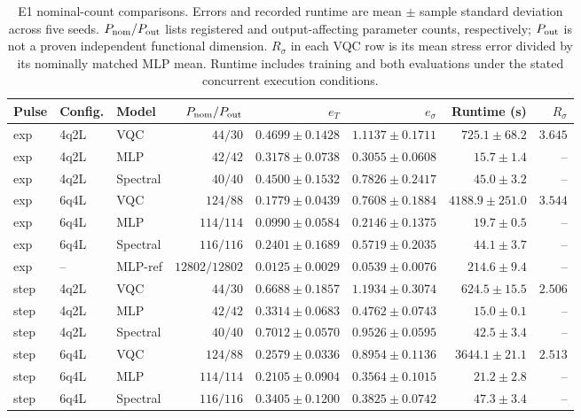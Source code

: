 \documentclass[11pt]{article}
\begin{document}
\begin{table}[htbp]
\centering
\caption{E1 nominal-count comparisons. Errors and recorded runtime are mean $\pm$ sample standard deviation across five seeds. $P_{\rm nom}/P_{\rm out}$ lists registered and output-affecting parameter counts, respectively; $P_{\rm out}$ is not a proven independent functional dimension. $R_\sigma$ in each VQC row is its mean stress error divided by its nominally matched MLP mean. Runtime includes training and both evaluations under the stated concurrent execution conditions.}
\label{tab:e1}
\scriptsize
\setlength{\tabcolsep}{3pt}
\begin{tabular}{lllrrrrr}
\toprule
Pulse & Config. & Model & $P_{\rm nom}/P_{\rm out}$ & $e_T$ & $e_\sigma$ & Runtime (s) & $R_\sigma$ \\
\midrule
exp & 4q2L & VQC & $44/30$ & $0.4699\pm0.1428$ & $1.1137\pm0.1711$ & $725.1\pm68.2$ & $3.645$ \\
exp & 4q2L & MLP & $42/42$ & $0.3178\pm0.0738$ & $0.3055\pm0.0608$ & $15.7\pm1.4$ & -- \\
exp & 4q2L & Spectral & $40/40$ & $0.4500\pm0.1532$ & $0.7826\pm0.2417$ & $45.0\pm3.2$ & -- \\
exp & 6q4L & VQC & $124/88$ & $0.1779\pm0.0439$ & $0.7608\pm0.1884$ & $4188.9\pm251.0$ & $3.544$ \\
exp & 6q4L & MLP & $114/114$ & $0.0990\pm0.0584$ & $0.2146\pm0.1375$ & $19.7\pm0.5$ & -- \\
exp & 6q4L & Spectral & $116/116$ & $0.2401\pm0.1689$ & $0.5719\pm0.2035$ & $44.1\pm3.7$ & -- \\
exp & -- & MLP-ref & $12802/12802$ & $0.0125\pm0.0029$ & $0.0539\pm0.0076$ & $214.6\pm9.4$ & -- \\
\midrule
step & 4q2L & VQC & $44/30$ & $0.6688\pm0.1857$ & $1.1934\pm0.3074$ & $624.5\pm15.5$ & $2.506$ \\
step & 4q2L & MLP & $42/42$ & $0.3314\pm0.0683$ & $0.4762\pm0.0743$ & $15.0\pm0.1$ & -- \\
step & 4q2L & Spectral & $40/40$ & $0.7012\pm0.0570$ & $0.9526\pm0.0595$ & $42.5\pm3.4$ & -- \\
step & 6q4L & VQC & $124/88$ & $0.2579\pm0.0336$ & $0.8954\pm0.1136$ & $3644.1\pm21.1$ & $2.513$ \\
step & 6q4L & MLP & $114/114$ & $0.2105\pm0.0904$ & $0.3564\pm0.1015$ & $21.2\pm2.8$ & -- \\
step & 6q4L & Spectral & $116/116$ & $0.3405\pm0.1200$ & $0.3825\pm0.0742$ & $47.3\pm3.4$ & -- \\

\end{tabular}
\end{table}
\end{document}

